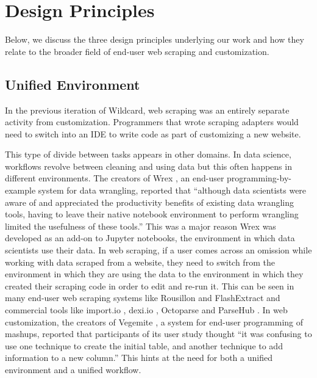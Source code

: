\documentclass[sigconf,10pt]{acmart}
\begin{document}
\hypertarget{sec:design-principles}{%
\section{Design Principles}\label{sec:design-principles}}

Below, we discuss the three design principles underlying our work and
how they relate to the broader field of end-user web scraping and
customization.

\hypertarget{unified-environment}{%
\subsection{Unified Environment}\label{unified-environment}}

In the previous iteration of Wildcard, web scraping was an entirely
separate activity from customization. Programmers that wrote scraping
adapters would need to switch into an IDE to write code as part of
customizing a new website.

This type of divide between tasks appears in other domains. In data
science, workflows revolve between cleaning and using data but this
often happens in different environments. The creators of Wrex
\citep{drosos2020}, an end-user programming-by-example system for data
wrangling, reported that ``although data scientists were aware of and
appreciated the productivity benefits of existing data wrangling tools,
having to leave their native notebook environment to perform wrangling
limited the usefulness of these tools.'' This was a major reason Wrex
was developed as an add-on to Jupyter notebooks, the environment in
which data scientists use their data. In web scraping, if a user comes
across an omission while working with data scraped from a website, they
need to switch from the environment in which they are using the data to
the environment in which they created their scraping code in order to
edit and re-run it. This can be seen in many end-user web scraping
systems like Rousillon \citep{chasins2018}and FlashExtract
\citep{le2014} and commercial tools like import.io \citep{zotero-77},
dexi.io \citep{dexi.io}, Octoparse \citep{zotero-83} and ParseHub
\citep{zotero-86}. In web customization, the creators of Vegemite
\citep{lin2009}, a system for end-user programming of mashups, reported
that participants of its user study thought ``it was confusing to use
one technique to create the initial table, and another technique to add
information to a new column.'' This hints at the need for both a unified
environment and a unified workflow.
\end{document}
